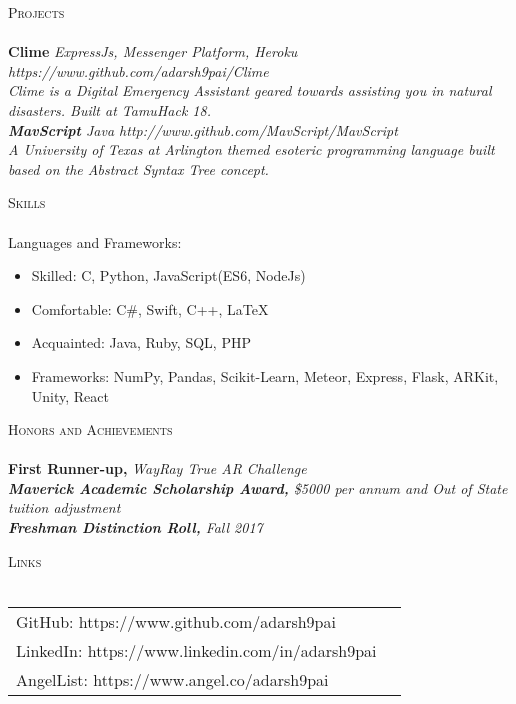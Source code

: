 \documentclass[a4paper]{article}
\newcommand{\lineunder} {
    \vspace*{-8pt} \\
    \hspace*{-18pt} \hrulefill \\
}
\newcommand{\header} [1] {
    {\hspace*{-18pt}\vspace*{6pt} \textsc{#1}}
    \vspace*{-6pt} \lineunder
}
\begin{document}
\header{Projects}
{\textbf{Clime}} \sl {ExpressJs, Messenger Platform, Heroku} \hfill https://www.github.com/adarsh9pai/Clime\\
Clime is a Digital Emergency Assistant geared towards assisting you in natural disasters. Built at TamuHack \textquotesingle{}18.\\
\vspace*{2mm}
{\textbf{MavScript}} \sl {Java} \hfill http://www.github.com/MavScript/MavScript\\
A University of Texas at Arlington themed esoteric programming language built based on the Abstract Syntax Tree concept.\\
\vspace*{2mm}

\header{Skills}
Languages and Frameworks:
\begin{itemize}
\item Skilled: C, Python, JavaScript(ES6, NodeJs)
\item Comfortable: C\#, Swift, C++, \LaTeX
\item Acquainted: Java, Ruby, SQL, PHP
\item Frameworks: NumPy, Pandas, Scikit-Learn, Meteor, Express, Flask, ARKit, Unity, React
\end{itemize}

\vspace{2mm}


\header{Honors and Achievements}
{\textbf{First Runner-up,}} \sl{WayRay True AR Challenge} \hfill \\
{\textbf{Maverick Academic Scholarship Award,}} \sl{\$5000 per annum and Out of State tuition adjustment} \hfill \\
{\textbf{Freshman Distinction Roll,}} \sl{Fall 2017} \hfill \\
\vspace*{2mm}

\header{Links}
\vspace{2mm} 
\begin{tabular}{ l l }
    GitHub: https://www.github.com/adarsh9pai   \\
    LinkedIn: https://www.linkedin.com/in/adarsh9pai   \\
    AngelList: https://www.angel.co/adarsh9pai   \\
  
    
	
\end{tabular}
\vspace{2mm}

\ 
\end{document}
